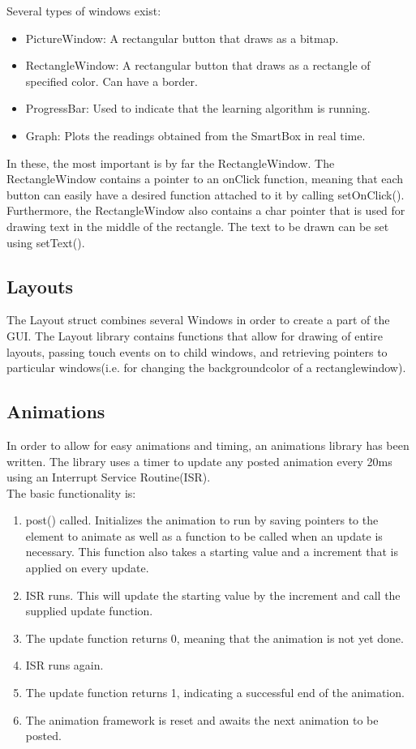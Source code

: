 \documentclass[danish,a4paper,11pt]{article}
\numberwithin{equation}{section}
\begin{document}
\noindent
Several types of windows exist:
\begin{itemize}
\item PictureWindow: A rectangular button that draws as a bitmap.
\item RectangleWindow: A rectangular button that draws as a rectangle of specified color. Can have a border.
\item ProgressBar: Used to indicate that the learning algorithm is running.
\item Graph: Plots the readings obtained from the SmartBox in real time.
\end{itemize}

In these, the most important is by far the RectangleWindow. The RectangleWindow contains a pointer to an onClick function, meaning that each button can easily have a desired function attached to it by calling setOnClick(). Furthermore, the RectangleWindow also contains a char pointer that is used for drawing text in the middle of the rectangle. The text to be drawn can be set using setText().

\subsection{Layouts}
The Layout struct combines several Windows in order to create a part of the GUI. The Layout library contains functions that allow for drawing of entire layouts, passing touch events on to child windows, and retrieving pointers to particular windows(i.e. for changing the backgroundcolor of a rectanglewindow).

\subsection{Animations}
In order to allow for easy animations and timing, an animations library has been written. The library uses a timer to update any posted animation every 20ms using an Interrupt Service Routine(ISR).\\

\noindent
The basic functionality is:
\begin{enumerate}
\item post() called. Initializes the animation to run by saving pointers to the element to animate as well as a function to be called when an update is necessary. This function also takes a starting value and a increment that is applied on every update.
\item ISR runs. This will update the starting value by the increment and call the supplied update function.
\item The update function returns 0, meaning that the animation is not yet done.
\item ISR runs again.
\item The update function returns 1, indicating a successful end of the animation.
\item The animation framework is reset and awaits the next animation to be posted.
\end{enumerate}
\end{document}
